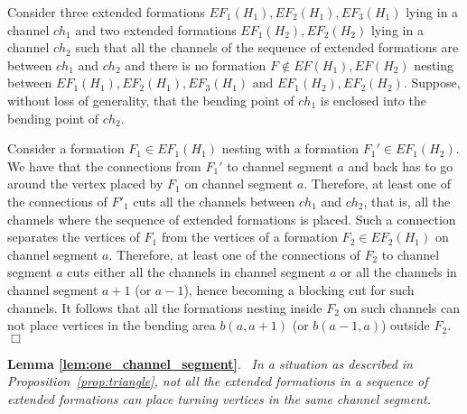 \documentclass[a4paper,10pt]{llncs}
\newcounter{prop}
\renewenvironment{proof}
{{\bf Proof:}}{\hspace*{\fill}$\Box$\par\vspace{2mm}}
\newcommand{\rephrase}[3]{\noindent\textbf{#1 #2}.~\emph{#3}}
\begin{document}
\begin{proof}
Consider three extended formations $EF_1(H_1), EF_2(H_1), EF_3(H_1)$ lying in a channel $ch_1$ and two extended formations $EF_1(H_2),EF_2(H_2)$ lying in a channel $ch_2$ such that all the channels of the sequence of extended formations are between $ch_1$ and $ch_2$ and there is no formation $F \not\in EF(H_1),EF(H_2)$ nesting between $EF_1(H_1), EF_2(H_1), EF_3(H_1)$ and $EF_1(H_2),EF_2(H_2)$. Suppose, without loss of generality, that the bending point of $ch_1$ is enclosed into the bending point of $ch_2$.

Consider a formation $F_1 \in EF_1(H_1)$ nesting with a formation $F_1' \in EF_1(H_2)$. We have that the connections from $F_1'$ to channel segment $a$ and back has to go around the vertex placed by $F_1$ on channel segment $a$. Therefore, at least one of the connections of $F'_1$ cuts all the channels between $ch_1$ and $ch_2$, that is, all the channels where the sequence of extended formations is placed. Such a connection separates the vertices of $F_1$ from the vertices of a formation $F_2 \in EF_2(H_1)$ on channel segment $a$. Therefore, at least one of the connections of $F_2$ to channel segment $a$ cuts either all the channels in channel segment $a$ or all the channels in channel segment $a+1$ (or $a-1$), hence becoming a blocking cut for such channels. It follows that all the formations nesting inside  $F_2$ on such channels can not place vertices in the bending area $b(a,a+1)$ (or $b(a-1,a)$) outside $F_2$.
\end{proof}

\rephrase{Lemma}{\ref{lem:one_channel_segment}}{
In a situation as described in Proposition~\ref{prop:triangle}, not all the extended formations in a sequence of extended formations can place turning vertices in the same channel segment.
}
\end{document}
